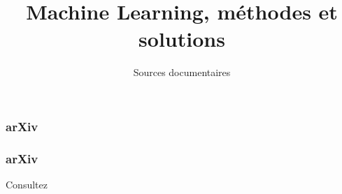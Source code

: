 \documentclass{formation}
\title{Machine Learning, méthodes et solutions}
\subtitle{Sources documentaires}
\begin{document}
\maketitle

\begin{frame}
  \frametitle{arXiv}
\end{frame}

\begin{frame}
  \frametitle{arXiv}
  Consultez 
\end{frame}
\end{document}

